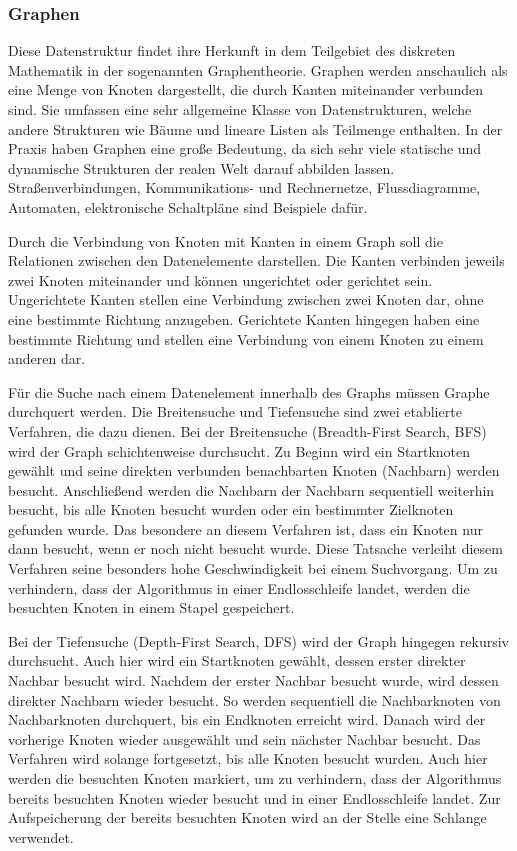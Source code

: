\subsubsection{Graphen}
Diese Datenstruktur findet ihre Herkunft in dem Teilgebiet des diskreten Mathematik in der sogenannten Graphentheorie. Graphen werden anschaulich als eine Menge von Knoten dargestellt, die durch Kanten miteinander verbunden sind. Sie umfassen eine sehr allgemeine Klasse von Datenstrukturen, welche andere Strukturen wie Bäume und lineare Listen als Teilmenge enthalten. In der Praxis haben Graphen eine große Bedeutung, da sich sehr viele statische und dynamische Strukturen der realen Welt darauf abbilden lassen. Straßenverbindungen, Kommunikations- und Rechnernetze, Flussdiagramme, Automaten, elektronische Schaltpläne sind Beispiele dafür. \autocite[215]{knebl_algorithmen_2021} \autocite[654]{ernst_grundkurs_2020}

Durch die Verbindung von Knoten mit Kanten in einem Graph soll die Relationen zwischen den Datenelemente darstellen. Die Kanten verbinden jeweils zwei Knoten miteinander und können ungerichtet oder gerichtet sein. Ungerichtete Kanten stellen eine Verbindung zwischen zwei Knoten dar, ohne eine bestimmte Richtung anzugeben. Gerichtete Kanten hingegen haben eine bestimmte Richtung und stellen eine Verbindung von einem Knoten zu einem anderen dar. \autocite[221-222]{knebl_algorithmen_2021}

Für die Suche nach einem Datenelement innerhalb des Graphs müssen Graphe durchquert werden. Die Breitensuche und Tiefensuche sind zwei etablierte Verfahren, die dazu dienen. Bei der Breitensuche (Breadth-First Search, BFS) wird der Graph schichtenweise durchsucht. Zu Beginn wird ein Startknoten gewählt und seine direkten verbunden benachbarten Knoten (Nachbarn) werden besucht. Anschließend werden die Nachbarn der Nachbarn sequentiell weiterhin besucht, bis alle Knoten besucht wurden oder ein bestimmter Zielknoten gefunden wurde. Das besondere an diesem Verfahren ist, dass ein Knoten nur dann besucht, wenn er noch nicht besucht wurde. Diese Tatsache verleiht diesem Verfahren seine besonders hohe Geschwindigkeit bei einem Suchvorgang. Um zu verhindern, dass der Algorithmus in einer Endlosschleife landet, werden die besuchten Knoten in einem Stapel gespeichert. \autocite[227-228]{knebl_algorithmen_2021} \autocite[666]{ernst_grundkurs_2020}

Bei der Tiefensuche (Depth-First Search, DFS) wird der Graph hingegen rekursiv durchsucht. Auch hier wird ein Startknoten gewählt, dessen erster direkter Nachbar besucht wird. Nachdem der erster Nachbar besucht wurde, wird dessen direkter Nachbarn wieder besucht. So werden sequentiell die Nachbarknoten von Nachbarknoten durchquert, bis ein Endknoten erreicht wird. Danach wird der vorherige Knoten wieder ausgewählt und sein nächster Nachbar besucht. Das Verfahren wird solange fortgesetzt, bis alle Knoten besucht wurden. Auch hier werden die besuchten Knoten markiert, um zu verhindern, dass der Algorithmus bereits besuchten Knoten wieder besucht und in einer Endlosschleife landet. Zur Aufspeicherung der bereits besuchten Knoten wird an der Stelle eine Schlange verwendet. \autocite[231-232]{knebl_algorithmen_2021} \autocite[666]{ernst_grundkurs_2020}

